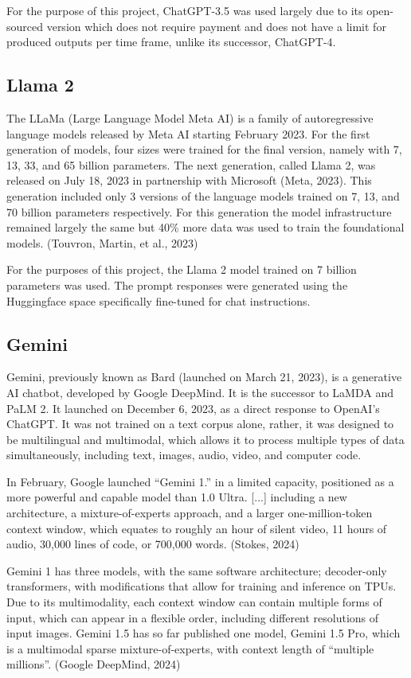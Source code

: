 \documentclass[fleqn,moreauthors,10pt]{ds_report}
\begin{document}
For the purpose of this project, ChatGPT-3.5 was used largely due to its open-sourced version which does not require payment and does not have a limit for produced outputs per time frame, unlike its successor, ChatGPT-4.


\subsection*{Llama 2}

The LLaMa (Large Language Model Meta AI) is a family of autoregressive language models released by Meta AI starting February 2023. For the first generation of models, four sizes were trained for the final version, namely with 7, 13, 33, and 65 billion parameters. The next generation, called Llama 2, was released on July 18, 2023 in partnership with Microsoft (Meta, 2023). This generation included only 3 versions of the language models trained on 7, 13, and 70 billion parameters respectively. For this generation the model infrastructure remained largely the same but 40\% more data was used to train the foundational models.  (Touvron, Martin, et al., 2023)

For the purposes of this project, the Llama 2 model trained on 7 billion parameters was used. The prompt responses were generated using the Huggingface space specifically fine-tuned for chat instructions.

\subsection*{Gemini}

Gemini, previously known as Bard (launched on March 21, 2023), is a generative AI chatbot, developed by Google DeepMind. It is the successor to LaMDA and PaLM 2. It launched on December 6, 2023, as a direct response to OpenAI’s ChatGPT. It was not trained on a text corpus alone, rather, it was designed to be multilingual and multimodal, which allows it to process multiple types of data simultaneously, including text, images, audio, video, and computer code.

In February, Google launched “Gemini 1.” in a limited capacity, positioned as a more powerful and capable model than 1.0 Ultra. [...] including a new architecture, a mixture-of-experts approach, and a larger one-million-token context window, which equates to roughly an hour of silent video, 11 hours of audio, 30,000 lines of code, or 700,000 words. (Stokes, 2024)

Gemini 1 has three models, with the same software architecture; decoder-only transformers, with modifications that allow for training and inference on TPUs. Due to its multimodality, each context window can contain multiple forms of input, which can appear in a flexible order, including different resolutions of input images. Gemini 1.5 has so far published one model, Gemini 1.5 Pro, which is a multimodal sparse mixture-of-experts, with context length of “multiple millions”. (Google DeepMind, 2024)
\end{document}
